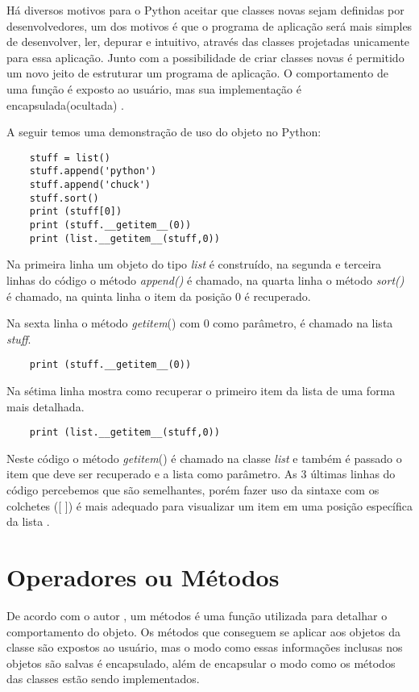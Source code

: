 	Há diversos motivos para o Python aceitar que classes novas sejam definidas por desenvolvedores, um dos motivos é que o programa de aplicação será mais simples de desenvolver, ler, depurar e intuitivo, através das classes projetadas unicamente para essa aplicação. Junto com a possibilidade de criar classes novas é permitido um novo jeito de estruturar um programa de aplicação. O comportamento de uma função é exposto ao usuário, mas sua implementação é encapsulada(ocultada) \cite{Borges2014}. 
	
	A seguir temos uma demonstração de uso do objeto no Python:
	
   \begin{lstlisting}
    stuff = list()
    stuff.append('python')
    stuff.append('chuck')
    stuff.sort()
    print (stuff[0])
    print (stuff.__getitem__(0))
    print (list.__getitem__(stuff,0))
    \end{lstlisting}
	
	Na primeira linha um objeto do tipo \textit{list} é construído, na segunda e terceira linhas do código o método \textit{append()} é chamado, na quarta linha o método \textit{sort()} é chamado, na quinta linha o item da posição 0 é recuperado. 
	
	Na sexta linha o método \textunderscore\textunderscore \textit{getitem}\textunderscore\textunderscore()  com 0 como parâmetro, é chamado na lista \textit{stuff}.
	\begin{lstlisting}
    print (stuff.__getitem__(0))
	\end{lstlisting}

	Na sétima linha mostra como recuperar o primeiro item da lista de uma forma mais detalhada.
	\begin{lstlisting}
    print (list.__getitem__(stuff,0))
	\end{lstlisting}
	
	Neste código o método \textunderscore\textunderscore \textit{getitem}\textunderscore\textunderscore () é chamado na classe \textit{list} e também é passado o item que deve ser recuperado e a lista como parâmetro. As 3 últimas linhas do código percebemos que são semelhantes, porém fazer uso da sintaxe com os colchetes ([ ]) é mais adequado para visualizar um item em uma posição específica da lista \cite{Severance2016}.
	
    \section{Operadores ou Métodos}
	De acordo com o autor \cite{Borges2014}, um métodos é uma função utilizada para detalhar o comportamento do objeto. Os métodos que conseguem se aplicar aos objetos da classe são expostos ao usuário, mas o modo como essas informações inclusas nos objetos são salvas é encapsulado, além de encapsular o modo como os métodos das classes estão sendo implementados.
	 
